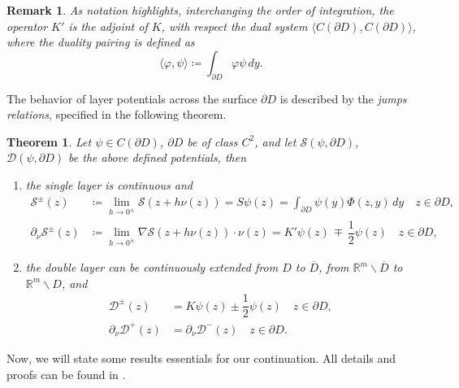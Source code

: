 \documentclass[10pt, a4paper, twoside, openright]{book}
\theoremstyle{definition}
\theoremstyle{plain}
\newtheorem{theorem}[subsection]{Theorem}
\theoremstyle{plain}
\theoremstyle{plain}
\theoremstyle{plain}
\newtheorem{remark}[subsection]{Remark}
\theoremstyle{plain}
\theoremstyle{plain}
\theoremstyle{plain}
\theoremstyle{plain}
\let\phi\varphi
\begin{document}
\begin{remark}
 As notation highlights, interchanging the order of integration, the operator $K'$ is the adjoint of $K$, with respect the dual system $\langle C(\partial D), C(\partial D)\rangle$, 
 where the duality pairing is defined as
 \begin{equation}
  \langle\phi,\psi\rangle\coloneqq\int_{\partial D}\phi\psi\,dy.
 \end{equation}
\end{remark}
The behavior of layer potentials across the surface $\partial D$ is described by the \emph{jumps relations}, 
specified in the following theorem.
\begin{theorem}
 Let $\psi\in C(\partial D)$, $\partial D$ be of class $C^2$, and let $\mathcal{S}(\psi,\partial D)$, $\mathcal{D}(\psi,\partial D)$ be the above defined potentials, then
 \begin{enumerate}
  \item the single layer is continuous and 
  \begin{subequations}
  \begin{align}
   \mathcal{S}^\pm(z) &\coloneqq\lim_{h\to 0^\pm}\mathcal{S}(z+h\nu(z)) = S\psi(z)=\int_{\partial D}\psi(y)\Phi(z,y)\,dy \quad z\in\partial D, \label{eq:single-pm-0}\\
   \partial_\nu\mathcal{S}^\pm(z) &\coloneqq \lim_{h\to0^\pm} \nabla\mathcal{S}(z+h\nu(z))\cdot\nu(z) =  K'\psi(z) \,\mp\,\dfrac{1}{2}\psi(z) \quad z\in\partial D,\label{eq:single-pm-1}
  \end{align}
 \end{subequations}
 \item the double layer can be continuously extended from $D$ to $\overline{D}$, from $\mathbb{R}^m\backslash \overline{D}$ to $\mathbb{R}^m\backslash D$, and
  \begin{subequations}
  \begin{align}
   \mathcal{D}^\pm(z) &= K\psi(z) \pm\dfrac{1}{2}\psi(z)\quad z\in\partial D, \label{eq:double-pm-0}\\
   \partial_\nu\mathcal{D}^+(z) &= \partial_\nu\mathcal{D}^-(z) \quad z\in\partial D. \label{eq:double-pm-1}
  \end{align}
  \end{subequations}
 \end{enumerate}
\end{theorem}
Now, we will state some results essentials for our continuation.
All details and proofs can be found in \cite{kress:book}.
\end{document}

